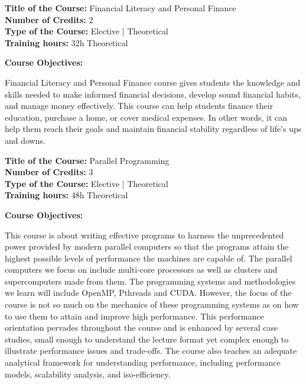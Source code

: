 \documentclass[12pt,a4paper]{article}
\begin{document}
\newpage
\textbf{Title of the Course:} Financial Literacy and Personal Finance\\
\textbf{Number of Credits:} 2\\
\textbf{Type of the Course:} Elective | Theoretical\\
\textbf{Training hours:} 32h Theoretical\par\vspace{4pt}
\textbf{Course Objectives:}\par\vspace{2pt}
Financial Literacy and Personal Finance course gives students the knowledge and skills needed to
make informed financial decisions, develop sound financial habits, and manage money effectively.
This course can help students finance their education, purchase a home, or cover medical expenses.
In other words, it can help them reach their goals and maintain financial stability regardless of
life’s ups and downs.\par\vspace{4pt}

\newpage
\textbf{Title of the Course:} Parallel Programming\\
\textbf{Number of Credits:} 3\\
\textbf{Type of the Course:} Elective | Theoretical\\
\textbf{Training hours:} 48h Theoretical\par\vspace{4pt}
\textbf{Course Objectives:}\par\vspace{2pt}
This course is about writing effective programs to harness the unprecedented power provided by
modern parallel computers so that the programs attain the highest possible levels of performance
the machines are capable of. The parallel computers we focus on include multi-core processors as
well as clusters and supercomputers made from them. The programming systems and
methodologies we learn will include OpenMP, Pthreads and CUDA. However, the focus of the
course is not so much on the mechanics of these programming systems as on how to use them to
attain and improve high performance. This performance orientation pervades throughout the
course and is enhanced by several case studies, small enough to understand the lecture format yet
complex enough to illustrate performance issues and trade-offs. The course also teaches an
adequate analytical framework for understanding performance, including performance models,
scalability analysis, and iso-efficiency.\par\vspace{4pt}
\end{document}
